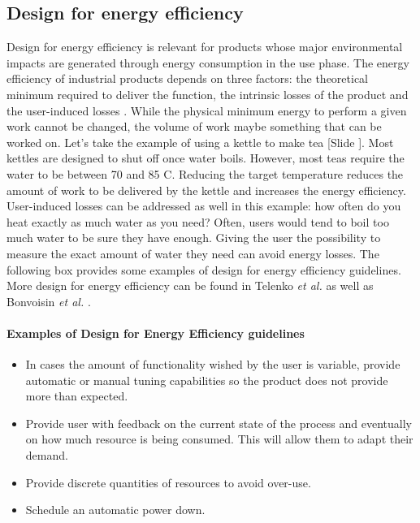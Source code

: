 \documentclass{article}
\newcounter{slide}
\begin{document}
\subsection{Design for energy efficiency}
\label{sec:DfEE}
Design for energy efficiency is relevant for products whose major environmental impacts are generated through energy consumption in the use phase. The energy efficiency of industrial products depends on three factors: the theoretical minimum required to deliver the function, the intrinsic losses of the product and the user-induced losses \cite{eliasUserefficientDesignReducing2011}. While the physical minimum energy to perform a given work cannot be changed, the volume of work maybe something that can be worked on. Let's take the example of using a kettle to make tea {\color{blue}[Slide ]}. Most kettles are designed to shut off once water boils. However, most teas require the water to be between 70 and 85 \textdegree C. Reducing the target temperature reduces the amount of work to be delivered by the kettle and increases the energy efficiency. User-induced losses can be addressed as well in this example: how often do you heat exactly as much water as you need? Often, users would tend to boil too much water to be sure they have enough. Giving the user the possibility to measure the exact amount of water they need can avoid energy losses. The following box provides some examples of design for energy efficiency guidelines. More design for energy efficiency can be found in Telenko \emph{et al.} \cite{telenkoCompilationDesignEnvironment2016a} as well as Bonvoisin \emph{et al.} \cite{bonvoisin2010design}.

\begin{framed} 
\footnotesize
\paragraph{Examples of Design for Energy Efficiency guidelines}
\begin{itemize}
  \item In cases the amount of functionality wished by the user is variable, provide automatic or manual tuning capabilities so the product does not provide more than expected.
	\item Provide user with feedback on the current state of the process and eventually on how much resource is being consumed. This will allow them to adapt their demand. 
	\item Provide discrete quantities of resources to avoid over-use. 
	\item Schedule an automatic power down.
\end{itemize}
\end{framed}
\end{document}
